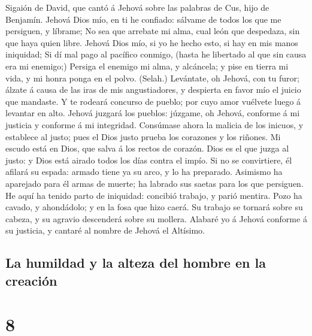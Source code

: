  Sigaión de David, que cantó á Jehová sobre las palabras
de Cus, hijo de Benjamín. Jehová Dios mío, en ti he confiado: sálvame de
todos los que me persiguen, y líbrame;  No sea que
arrebate mi alma, cual león que despedaza, sin que haya quien libre.
 Jehová Dios mío, si yo he hecho esto, si hay en mis manos
iniquidad;  Si dí mal pago al pacífico conmigo, (hasta he
libertado al que sin causa era mi enemigo;)  Persiga el
enemigo mi alma, y alcáncela; y pise en tierra mi vida, y mi honra ponga
en el polvo. (Selah.)  Levántate, oh Jehová, con tu furor;
álzate á causa de las iras de mis angustiadores, y despierta en favor
mío el juicio que mandaste.  Y te rodeará concurso de
pueblo; por cuyo amor vuélvete luego á levantar en alto. 
Jehová juzgará los pueblos: júzgame, oh Jehová, conforme á mi justicia y
conforme á mi integridad.  Consúmase ahora la malicia de
los inicuos, y establece al justo; pues el Dios justo prueba los
corazones y los riñones.  Mi escudo está en Dios, que
salva á los rectos de corazón.  Dios es el que juzga al
justo: y Dios está airado todos los días contra el impío.
 Si no se convirtiere, él afilará su espada: armado tiene
ya su arco, y lo ha preparado.  Asimismo ha aparejado
para él armas de muerte; ha labrado sus saetas para los que persiguen.
 He aquí ha tenido parto de iniquidad: concibió trabajo,
y parió mentira.  Pozo ha cavado, y ahondádolo; y en la
fosa que hizo caerá.  Su trabajo se tornará sobre su
cabeza, y su agravio descenderá sobre su mollera. 
Alabaré yo á Jehová conforme á su justicia, y cantaré al nombre de
Jehová el Altísimo.

\hypertarget{la-humildad-y-la-alteza-del-hombre-en-la-creaciuxf3n}{%
\subsection{La humildad y la alteza del hombre en la
creación}\label{la-humildad-y-la-alteza-del-hombre-en-la-creaciuxf3n}}

\hypertarget{section-7}{%
\section{8}\label{section-7}}

